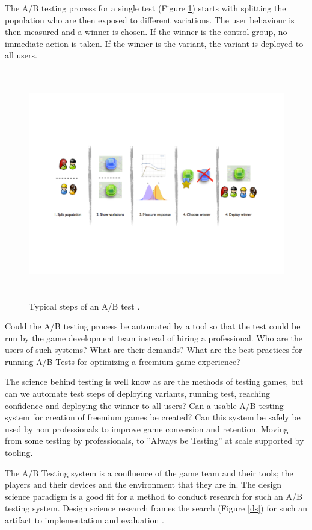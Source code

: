 \documentclass[english,12pt,a4paper,pdftex,elec,utf8]{aaltothesis}
\begin{document}
The A/B testing process for a single test (Figure \ref{abtesting-steps}) starts with splitting the population who are then exposed to different variations. The user behaviour is then measured and a winner is chosen. If the winner is the control group, no immediate action is taken. If the winner is the variant, the variant is deployed to all users. \cite{Collins2014}

\begin{figure}[htb]
\centering \includegraphics[height=10cm]{diagrams/abtesting_steps}
\caption{Typical steps of an A/B test \cite[p.11]{Collins2014}.\label{abtesting-steps}}
\end{figure}

Could the A/B testing process be automated by a tool so that the test could be run by the game development team instead of hiring a professional. Who are the users of such systems? What are their demands? What are the best practices for running A/B Tests for optimizing a freemium game experience?

The science behind testing is well know as are the methods of testing games, but can we automate test steps of deploying variants, running test, reaching confidence and deploying the winner to all users? Can a usable A/B testing system for creation of freemium games be created? Can this system be safely be used by non professionals to improve game conversion and retention. Moving from some testing by professionals, to ''Always be Testing'' \cite{Siroker2013} at scale supported by tooling.

The A/B Testing system is a confluence of the game team and their tools; the players and their devices and the environment that they are in. The design science paradigm is a good fit for a method to conduct research for such an A/B testing system. Design science research frames the search (Figure \ref{ds}) for such an artifact to implementation and evaluation \cite[p. 75]{Hevner2004}.
\end{document}
